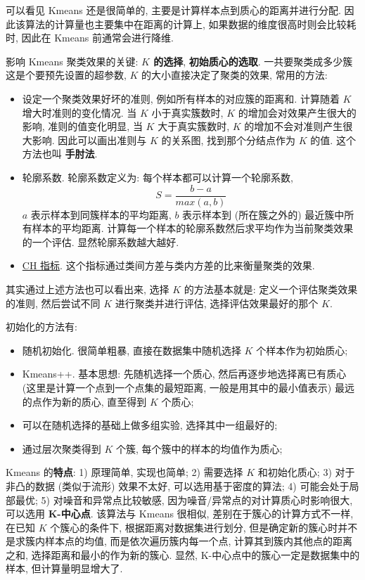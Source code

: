 可以看见 Kmeans 还是很简单的, 主要是计算样本点到质心的距离并进行分配. 因此该算法的计算量也主要集中在距离的计算上, 如果数据的维度很高时则会比较耗时, 因此在 Kmeans 前通常会进行降维.

影响 Kmeans 聚类效果的关键: \textbf{$K$ 的选择}, \textbf{初始质心的选取}. 一共要聚类成多少簇这是个要预先设置的超参数, $K$ 的大小直接决定了聚类的效果, 常用的方法:
\begin{itemize}
	\item 设定一个聚类效果好坏的准则, 例如所有样本的对应簇的距离和. 计算随着 $K$ 增大时准则的变化情况. 当 $K$ 小于真实簇数时, $K$ 的增加会对效果产生很大的影响, 准则的值变化明显, 当 $K$ 大于真实簇数时, $K$ 的增加不会对准则产生很大影响. 因此可以画出准则与 $K$ 的关系图, 找到那个分结点作为 $K$ 的值. 这个方法也叫 \textbf{手肘法}.
	
	\item 轮廓系数. 轮廓系数定义为: 每个样本都可以计算一个轮廓系数, 
	$$
	S = \frac{b - a}{max(a, b)}
	$$
	$a$ 表示样本到同簇样本的平均距离, $b$ 表示样本到 (所在簇之外的) 最近簇中所有样本的平均距离. 计算每一个样本的轮廓系数然后求平均作为当前聚类效果的一个评估. 显然轮廓系数越大越好. 
	
	\item \href{https://scikit-learn.org/stable/modules/clustering.html#calinski-harabasz-index}{CH 指标}. 这个指标通过类间方差与类内方差的比来衡量聚类的效果.
\end{itemize} 

其实通过上述方法也可以看出来, 选择 $K$ 的方法基本就是: 定义一个评估聚类效果的准则, 然后尝试不同 $K$ 进行聚类并进行评估, 选择评估效果最好的那个 $K$.


初始化的方法有:
\begin{itemize}
	\item 随机初始化. 很简单粗暴, 直接在数据集中随机选择 $K$ 个样本作为初始质心;
	
	\item Kmeans++. 基本思想: 先随机选择一个质心, 然后再逐步地选择离已有质心 (这里是计算一个点到一个点集的最短距离, 一般是用其中的最小值表示) 最远的点作为新的质心, 直至得到 $K$ 个质心;
	
	\item 可以在随机选择的基础上做多组实验, 选择其中一组最好的;
	
	\item 通过层次聚类得到 $K$ 个簇, 每个簇中的样本的均值作为质心;
\end{itemize}

Kmeans 的\textbf{特点}: 1) 原理简单, 实现也简单; 2) 需要选择 $K$ 和初始化质心; 3) 对于非凸的数据 (类似于流形) 效果不太好, 可以选用基于密度的算法; 4) 可能会处于局部最优; 5) 对噪音和异常点比较敏感, 因为噪音/异常点的对计算质心时影响很大, 可以选用 \textbf{K-中心点}. 该算法与 Kmeans 很相似, 差别在于簇心的计算方式不一样, 在已知 $K$ 个簇心的条件下, 根据距离对数据集进行划分, 但是确定新的簇心时并不是求簇内样本点的均值, 而是依次遍历簇内每一个点, 计算其到簇内其他点的距离之和, 选择距离和最小的作为新的簇心. 显然, K-中心点中的簇心一定是数据集中的样本, 但计算量明显增大了.

